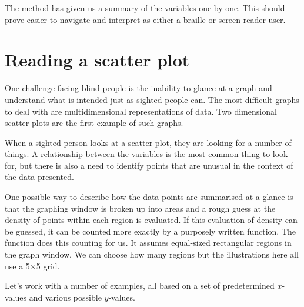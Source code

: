 The  method has given us a summary of the variables one by one. This should prove easier to navigate and interpret as either a braille or screen reader user. 
 
\section{Reading a scatter plot} 
 
 
One challenge facing blind people is the inability to  
glance at a graph and understand what is intended just as sighted people can. The most difficult graphs to deal with are multidimensional representations of data. Two dimensional scatter plots are the first example of such graphs. 
 
When a sighted person looks at a scatter plot, they are looking for a number of things. A relationship between the variables is the most common thing to look for, but there is also a need to identify points that are unusual in the context of the data presented. 
 
One possible way to describe how the data points are summarised at a glance is that the graphing window is broken up into areas and a rough guess at the density of points within each region is evaluated. If this evaluation of density can be guessed, it can be counted more exactly by a purposely written function. The  function does this counting for us. It assumes equal-sized rectangular regions in the graph window. We can choose how many regions but the illustrations here all use a 5$\times$5 grid. 
 
Let's work with a number of examples, all based on a set of predetermined $x$-values and various possible $y$-values. 
\begin{knitrout}
\color{fgcolor}\begin{kframe}
\begin{alltt}
\hlstd{> }\hlkwb{=}\hlstd{(}\hlopt{:}\hlstd{)}\hlopt{/}
\hlstd{> }\hlkwb{=}\hlopt{*}\hlopt{+}\hlstd{(}\hlstd{)}
\hlstd{> }\hlkwb{=}\hlstd{(}\hlopt{*}\hlopt{-}\hlstd{)}\hlopt{^}\hlopt{+}\hlstd{(}\hlstd{)}\hlopt{/}
\hlstd{> }\hlkwb{=}\hlopt{*}\hlopt{+}\hlstd{(}\hlstd{)}
\hlstd{> }\hlkwb{=}\hlstd{y3; y4[}\hlstd{]}\hlkwb{=}
\end{alltt}
\end{kframe}
\end{knitrout}
 
